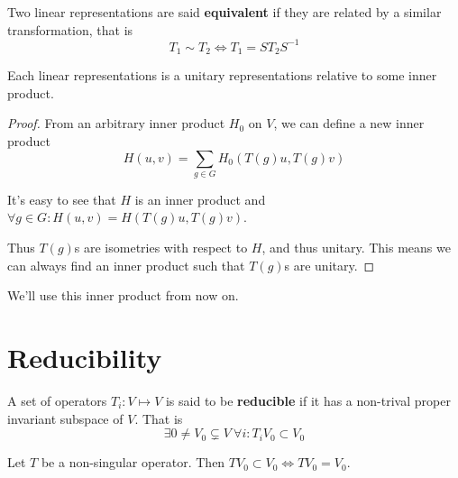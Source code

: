 \documentclass[12pt]{book}
\begin{document}
	
	\begin{definition}
	Two linear representations are said \textbf{equivalent} if they are related by a similar transformation, that is 
	\begin{equation}
		T_1\sim T_2\iff T_1=ST_2S^{-1}
	\end{equation}
	\end{definition}
	
	\begin{lemma}
		Each linear representations is a unitary representations relative to some inner product.
	\end{lemma}
	\begin{proof}
	From an arbitrary inner product $H_0$ on $V$, we can define a new inner product
	\begin{equation}
		H(u,v)=\sum_{g\in G}H_0(T(g)u,T(g)v)
	\end{equation}
	
	It's easy to see that $H$ is an inner product and $\forall g \in G: H(u,v)=H(T(g)u,T(g)v)$.
	
	Thus $T(g)$s are isometries with respect to $H$, and thus unitary. This means we can always find an inner product such that $T(g)$s are unitary. 
	\end{proof}
	We'll use this inner product from now on.
	\section{Reducibility}
	
	\begin{definition}
	A set of operators $T_i:V\mapsto V$ is said to be {\bf reducible} if it has a non-trival proper invariant subspace of $V$. That is
	\begin{equation}
		\exists 0\neq V_0\subsetneq V\ \forall i:T_iV_0\subset V_0
	\end{equation}
	\end{definition}

	
	\begin{lemma}
		Let $T$ be a non-singular operator. Then $T V_0\subset V_0\iff T V_0=V_0$.
	\end{lemma}
	
\end{document}
